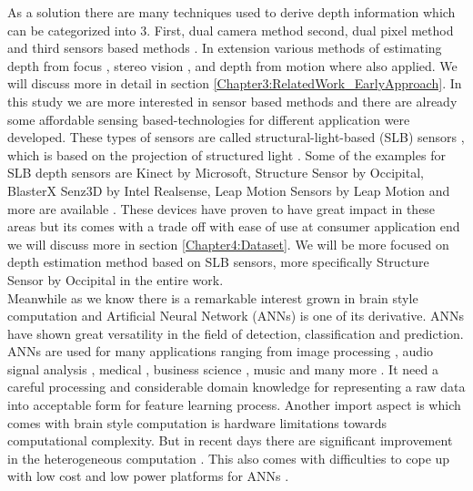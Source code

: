 As a solution there are many techniques used to derive depth information which can be categorized into 3. First, dual camera method \cite{li2009dual} second,  dual pixel method \cite{martinello2015dual, choi2017all} and  third sensors based methods \cite{salvi2004pattern}. In extension various methods of estimating depth from focus \cite{grossmann1987depth}, stereo vision \cite{bulthoff1988integration}, and depth from motion \cite{ullman1979interpretation} where also applied. We will discuss more in detail in section \ref{Chapter3:RelatedWork_EarlyApproach}. In this study we are more interested in sensor based methods and there are already some affordable sensing based-technologies for different application were developed. These types of sensors are called structural-light-based (SLB) sensors \cite{salvi2004pattern}, which is based on the projection of structured light \cite{zhang2012microsoft}. Some of the examples for SLB depth sensors are Kinect by Microsoft, Structure Sensor by Occipital, BlasterX Senz3D by Intel Realsense, Leap Motion Sensors by Leap Motion \cite{marin2014hand} and more are available \cite{mal2018sparse}. These devices have proven to have great impact in these areas but its comes with a trade off with ease of use at consumer application end we will discuss more in section \ref{Chapter4:Dataset}. We will be more focused on depth estimation method based on SLB sensors, more specifically Structure Sensor by Occipital in the entire work.\\

Meanwhile as we know there is a remarkable interest grown in brain style computation and Artificial Neural Network (ANNs) is one of its derivative. ANNs have shown great versatility in the field of detection, classification and prediction. ANNs are used for many applications ranging from image processing \cite{guyon1991applications} , audio signal analysis \cite{bourlard1993continuous}, medical \cite{baxt1990use}, business science \cite{widrow1994neural}, music \cite{nadar2019towards} and many more \cite{zhang2000neural}. It  need a careful processing and considerable domain knowledge for representing a raw data into acceptable form for feature learning process. Another import aspect is which comes with brain style computation is hardware limitations towards computational complexity. But in recent days there are significant improvement in the heterogeneous computation \cite{mittal2015survey}. This also comes with difficulties to cope up with low cost and low power platforms for ANNs \cite{mittal2019survey}. \\





